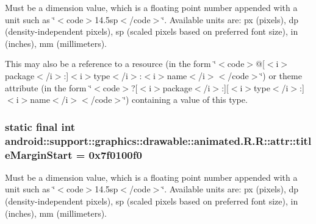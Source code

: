 Must be a dimension value, which is a floating point number appended with a unit such as \char`\"{}$<$code$>$14.5sp$<$/code$>$\char`\"{}. Available units are: px (pixels), dp (density-independent pixels), sp (scaled pixels based on preferred font size), in (inches), mm (millimeters). 

This may also be a reference to a resource (in the form \char`\"{}$<$code$>$@\mbox{[}$<$i$>$package$<$/i$>$:\mbox{]}$<$i$>$type$<$/i$>$:$<$i$>$name$<$/i$>$$<$/code$>$\char`\"{}) or theme attribute (in the form \char`\"{}$<$code$>$?\mbox{[}$<$i$>$package$<$/i$>$:\mbox{]}\mbox{[}$<$i$>$type$<$/i$>$:\mbox{]}$<$i$>$name$<$/i$>$$<$/code$>$\char`\"{}) containing a value of this type. \hypertarget{classandroid_1_1support_1_1graphics_1_1drawable_1_1animated_1_1_r_1_1attr_9278d5a2389e2fdcb973464778730f8c}{
\subsubsection[{titleMarginStart}]{\setlength{\rightskip}{0pt plus 5cm}static final int android::support::graphics::drawable::animated.R.R::attr::titleMarginStart = 0x7f0100f0}}
\label{classandroid_1_1support_1_1graphics_1_1drawable_1_1animated_1_1_r_1_1attr_9278d5a2389e2fdcb973464778730f8c}


Must be a dimension value, which is a floating point number appended with a unit such as \char`\"{}$<$code$>$14.5sp$<$/code$>$\char`\"{}. Available units are: px (pixels), dp (density-independent pixels), sp (scaled pixels based on preferred font size), in (inches), mm (millimeters). 


